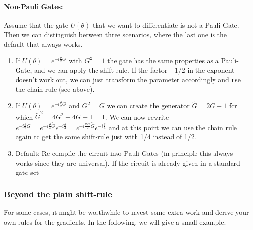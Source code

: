 \paragraph{Non-Pauli Gates:} Assume that the gate $U(\theta)$ that we want to differentiate is not a Pauli-Gate. Then we can distinguish between three scenarios, where the last one is the default that always works.
\begin{enumerate}
    \item If $U(\theta) = e^{-i\frac{\theta}{2} G}$ with $G^2=1$ the gate has the same properties as a Pauli-Gate, and we can apply the shift-rule. If the factor $-1/2$ in the exponent doesn't work out, we can just transform the parameter accordingly and use the chain rule (see above). 
    \item If $U(\theta) = e^{-i\frac{\theta}{2} G}$ and $G^2 = G$ we can create the generator $\tilde{G} = 2G-1$ for which $\tilde{G}^2 = 4G^2 -4G + 1 = 1$. We can now rewrite $e^{-i\frac{\theta}{2}G} = e^{-i\frac{\theta}{4}\tilde{G}} e^{-i\frac{\theta}{4}} = e^{-i\frac{\theta/2}{2}\tilde{G}} e^{-i\frac{\theta}{4}}$ and at this point we can use the chain rule again to get the same shift-rule just with 1/4 instead of 1/2.  
    \item Default: Re-compile the circuit into Pauli-Gates (in principle this always works since they are universal). If the circuit is already given in a standard gate set 
\end{enumerate}

\subsubsection*{Beyond the plain shift-rule}
For some cases, it might be worthwhile to invest some extra work and derive your own rules for the gradients. In the following, we will give a small example.


